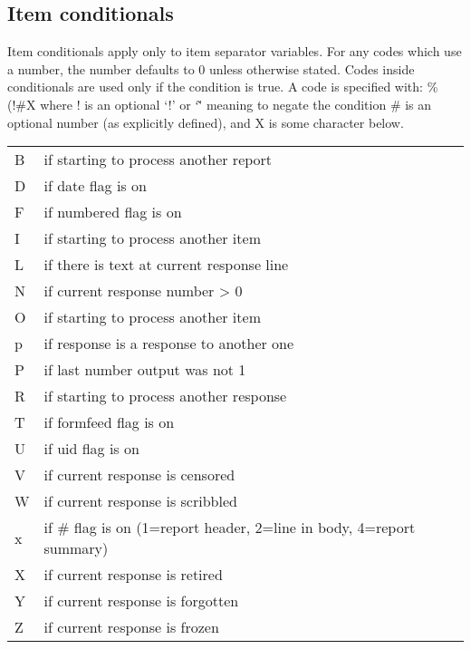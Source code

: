 \documentclass[twoside]{report}
\begin{document}

      \subsection{Item conditionals}

         Item conditionals apply only to item separator
         variables.  For any codes which use a number, the number defaults to 0
         unless otherwise stated.  Codes inside conditionals are used only if
         the condition is true.  A code is specified with: \%(!\#X 
         where ! is an optional `!' or `\~' meaning to negate the condition
         \# is an optional number (as explicitly defined), 
         and X is some character below.
   
         \tablelasttail{\hline}
         \begin{supertabular}{ll}
            B     & if starting to process another report  \\
            D     & if date flag is on \\
            F     & if numbered flag is on \\
            I     & if starting to process another item \\
            L     & if there is text at current response line \\
            N     & if current response number > 0 \\
            O     & if starting to process another item  \\
            p     & if response is a response to another one \\
            P     & if last number output was not 1 \\
            R     & if starting to process another response \\
            T     & if formfeed flag is on \\
            U     & if uid flag is on    \\
            V     & if current response is censored  \\
            W     & if current response is scribbled \\
            x     & if \# flag is on (1=report header, 2=line in body, 
                    4=report summary) \\
            X     & if current response is retired   \\
            Y     & if current response is forgotten \\
            Z     & if current response is frozen    \\
          \end{supertabular}
\vspace{12pt}
\end{document}
